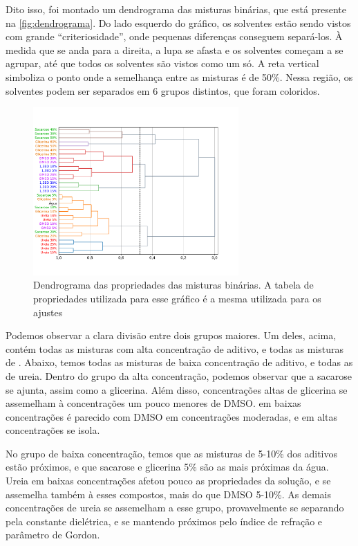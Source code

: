 		Dito isso, foi montado um dendrograma das misturas binárias, que está presente na \autoref{fig:dendrograma}. Do lado esquerdo do gráfico, os solventes estão sendo vistos com grande ``criteriosidade'', onde pequenas diferenças conseguem separá-los. À medida que se anda para a direita, a lupa se afasta e os solventes começam a se agrupar, até que todos os solventes são vistos como um só. A reta vertical simboliza o ponto onde a semelhança entre as misturas é de 50\%. Nessa região, os solventes podem ser separados em 6 grupos distintos, que foram coloridos.\cite{MarciaQuimiometria}
		
		\begin{figure}[h]
			\centering
			\includegraphics[width=0.7\textwidth]{imagens/propriedades/dendrograma}
			\caption{Dendrograma das propriedades das misturas binárias. A tabela de propriedades utilizada para esse gráfico é a mesma utilizada para os ajustes}
			\label{fig:dendrograma}
		\end{figure}
		
		Podemos observar a clara divisão entre dois grupos maiores. Um deles, acima, contém todas as misturas com alta concentração de aditivo, e todas as misturas de \BD{}. Abaixo, temos todas as misturas de baixa concentração de aditivo, e todas as de ureia. Dentro do grupo da alta concentração, podemos observar que a sacarose se ajunta, assim como a glicerina. Além disso, concentrações altas de glicerina se assemelham à concentrações um pouco menores de DMSO. \BD{} em baixas concentrações é parecido com DMSO em concentrações moderadas, e \BD{} em altas concentrações se isola.
		
		No grupo de baixa concentração, temos que as misturas de 5-10\% dos aditivos estão próximos, e que sacarose e glicerina 5\% são as mais próximas da água. Ureia em baixas concentrações afetou pouco as propriedades da solução, e se assemelha também à esses compostos, mais do que DMSO 5-10\%. As demais concentrações de ureia se assemelham a esse grupo, provavelmente se separando pela constante dielétrica, e se mantendo próximos pelo índice de refração e parâmetro de Gordon.
		
